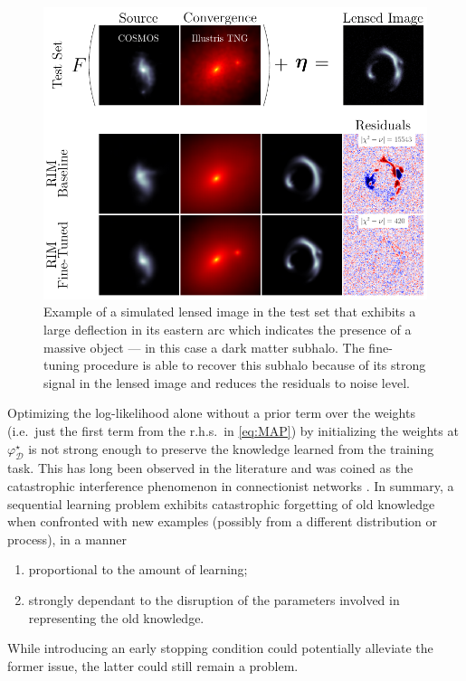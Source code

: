 \begin{figure}[tb!]
       \centering 
       \includegraphics[width=0.8\linewidth]{figures/main_figurev2}
       \caption{Example of a simulated lensed image in the test set that 
exhibits a large deflection in its eastern arc which indicates the presence of a massive object
 --- in this case a dark matter subhalo. The fine-tuning procedure is able to recover 
this subhalo because of its strong signal in the lensed image and reduces the residuals 
to noise level.}
       \label{fig:main figure}
\end{figure}

Optimizing the log-likelihood alone without a prior term over the weights (i.e.~just the first term from the r.h.s.~in \eqref{eq:MAP}) by initializing the weights at $\varphi^\star_\mathcal{D}$ is not strong 
enough to preserve the knowledge learned from the training task. 
This has long been observed in the literature and was coined as the 
catastrophic interference phenomenon in 
connectionist networks \citep{McCloskey1989,Ratcliff1990}.
In summary, a sequential learning problem exhibits catastrophic 
forgetting of old knowledge when confronted with new examples (possibly 
from a different distribution or process), in a manner 
\begin{enumerate}%
        \item \label{cf:steps} proportional to the amount of learning;
        \item \label{cf:weights} strongly dependant to the disruption of the parameters
                involved in representing the old knowledge.
\end{enumerate}
While introducing an early stopping condition could 
potentially alleviate the former issue, the latter could still remain a problem.

